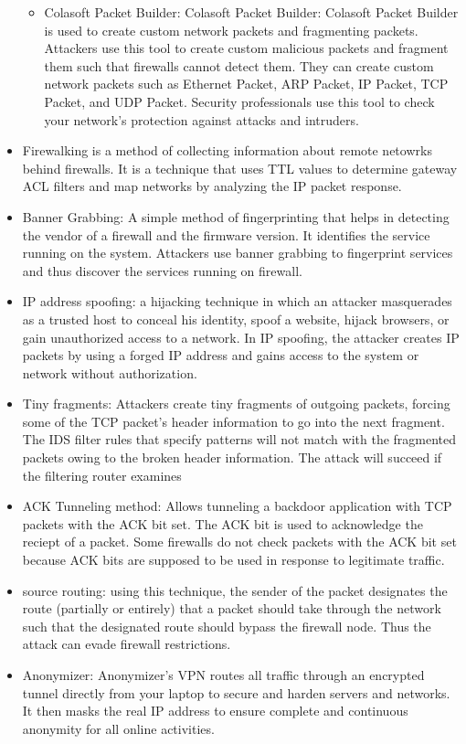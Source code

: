 \begin{itemize}
\begin{itemize}
        \item Colasoft Packet Builder: Colasoft Packet Builder: Colasoft Packet Builder is used to create custom network packets and fragmenting packets. Attackers use this tool to create custom malicious packets and fragment them such that firewalls cannot detect them. They can create custom network packets such as Ethernet Packet, ARP Packet, IP Packet, TCP Packet, and UDP Packet. Security professionals use this tool to check your network's protection against attacks and intruders.
    \end{itemize}
    \item Firewalking is a method of collecting information about remote netowrks behind firewalls. It is a technique that uses TTL values to determine gateway ACL filters and map networks by analyzing the IP packet response.
    \item Banner Grabbing: A simple method of fingerprinting that helps in detecting the vendor of a firewall and the firmware version. It identifies the service running on the system. Attackers use banner grabbing to fingerprint services and thus discover the services running on firewall.
    \item IP address spoofing: a hijacking technique in which an attacker masquerades as a trusted host to conceal his identity, spoof a website, hijack browsers, or gain unauthorized access to a network. In IP spoofing, the attacker creates IP packets by using a forged IP address and gains access to the system or network without authorization.
    \item Tiny fragments: Attackers create tiny fragments of outgoing packets, forcing some of the TCP packet's header information to go into the next fragment. The IDS filter rules that specify patterns will not match with the fragmented packets owing to the broken header information. The attack will succeed if the filtering router examines 
    \item ACK Tunneling method: Allows tunneling a backdoor application with TCP packets with the ACK bit set. The ACK bit is used to acknowledge the reciept of a packet. Some firewalls do not check packets with the ACK bit set because ACK bits are supposed to be used in response to legitimate traffic.
    \item source routing: using this technique, the sender of the packet designates the route (partially or entirely) that a packet should take through the network such that the designated route should bypass the firewall node. Thus the attack can evade firewall restrictions.
    \item Anonymizer: Anonymizer's VPN routes all traffic through an encrypted tunnel directly from your laptop to secure and harden servers and networks. It then masks the real IP address to ensure complete and continuous anonymity for all online activities.
\end{itemize}
